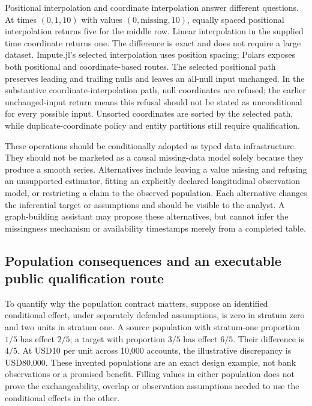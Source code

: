 Positional interpolation and coordinate interpolation answer different questions. At times $(0,1,10)$ with values $(0,\mathrm{missing},10)$, equally spaced positional interpolation returns five for the middle row. Linear interpolation in the supplied time coordinate returns one. The difference is exact and does not require a large dataset. Impute.jl's selected interpolation uses position spacing; Polars exposes both positional and coordinate-based routes. The selected positional path preserves leading and trailing nulls and leaves an all-null input unchanged. In the substantive coordinate-interpolation path, null coordinates are refused; the earlier unchanged-input return means this refusal should not be stated as unconditional for every possible input. Unsorted coordinates are sorted by the selected path, while duplicate-coordinate policy and entity partitions still require qualification.\citep{exec25_otm_imputejl,exec25_otm_polars,exec25_otm_choice}

These operations should be conditionally adopted as typed data infrastructure. They should not be marketed as a causal missing-data model solely because they produce a smooth series. Alternatives include leaving a value missing and refusing an unsupported estimator, fitting an explicitly declared longitudinal observation model, or restricting a claim to the observed population. Each alternative changes the inferential target or assumptions and should be visible to the analyst. A graph-building assistant may propose these alternatives, but cannot infer the missingness mechanism or availability timestamps merely from a completed table.\citep{exec25_otm_choice}

\subsection{Population consequences and an executable public qualification route}

To quantify why the population contract matters, suppose an identified conditional effect, under separately defended assumptions, is zero in stratum zero and two units in stratum one. A source population with stratum-one proportion $1/5$ has effect $2/5$; a target with proportion $3/5$ has effect $6/5$. Their difference is $4/5$. At USD10 per unit across 10,000 accounts, the illustrative discrepancy is USD80,000. These invented populations are an exact design example, not bank observations or a promised benefit. Filling values in either population does not prove the exchangeability, overlap or observation assumptions needed to use the conditional effects in the other.\citep{exec25_otm_choice}

